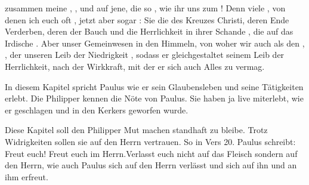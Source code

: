  zusammen meine , , und   auf jene, die so , wie ihr uns zum  ! Denn viele , von denen ich euch oft , jetzt aber sogar  : Sie  die  des Kreuzes Christi, deren Ende Verderben, deren  der Bauch und die Herrlichkeit in ihrer Schande , die auf das Irdische . Aber unser Gemeinwesen  in den Himmeln, von woher wir auch als  den , , der unseren Leib der Niedrigkeit  , sodass er gleichgestaltet  seinem Leib der Herrlichkeit, nach der Wirkkraft, mit der er sich auch Alles zu  vermag.

\begin{otsblock}
    \begin{itshape}
        In diesem Kapitel spricht Paulus wie er sein Glaubensleben und seine Tätigkeiten erlebt. Die Philipper kennen die Nöte von Paulus. Sie haben ja live miterlebt, wie er geschlagen und in den Kerkers geworfen wurde.

        Diese Kapitel soll den Philipper Mut machen standhaft zu bleibe. Trotz Widrigkeiten sollen sie auf den Herrn vertrauen. So in Vers 20. Paulus schreibt: \flqq Freut euch! Freut euch im Herrn.\frqq Verlasst euch nicht auf das Fleisch sondern auf den Herrn, wie auch Paulus sich auf den Herrn verlässt und sich auf ihn und an ihm erfreut.
    \end{itshape}
\end{otsblock}